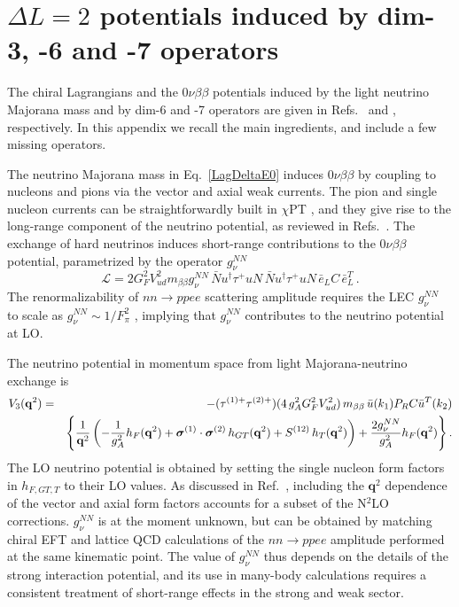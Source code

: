 \documentclass[letterpaper,11pt]{article}
\newcommand{\Dt}{\Delta}
\newcommand{\boldsigma}{\mbox{\boldmath $\sigma$}}
\renewcommand{\vec}[1]{{\mathbf #1}}
\newcommand{\sq}{^{2}}
\newcommand{\nn}{\nonumber}
\begin{document}
\section{$\Dt L=2$ potentials induced by dim-3, -6 and -7 operators} 
\label{app:neutrinopotentials567}


The chiral Lagrangians and the $0\nu\beta\beta$ potentials induced by the light neutrino Majorana mass
and by dim-6 and -7 operators are given in Refs.\ \cite{Cirigliano:2017tvr,Cirigliano:2018hja}
and \cite{Cirigliano:2017djv}, respectively.  In this appendix we recall the main ingredients, and 
include a few missing operators.


The neutrino Majorana mass in Eq.\ \eqref{LagDeltaE0} induces $0\nu\beta\beta$ by coupling to  nucleons and pions via the vector and axial weak currents.
The pion and single nucleon currents can be straightforwardly built in $\chi$PT \cite{Gasser:1983yg,Bernard:1995dp}, 
and they give rise to the long-range component of the neutrino potential, as reviewed in Refs.\ \cite{Cirigliano:2017tvr,Cirigliano:2017djv}.
The exchange of hard neutrinos induces short-range contributions to the $0\nu\beta\beta$ potential, parametrized  by the operator  $g_{\nu}^{NN}$
\begin{equation}\label{gnuNN}
\mathcal L =  2 G_F^2 V_{ud}^2 m_{\beta\beta} g_{\nu}^{NN} \, \bar N u^{\dagger} \tau^+ u N \, \bar N u^{\dagger} \tau^+ u N\, \bar e_L C \, \bar e_L^T\,.
\end{equation}
The renormalizability of $n n \rightarrow p p e e$ scattering amplitude requires the LEC $g^{NN}_{\nu}$
to scale as $g_{\nu}^{NN} \sim 1/F_\pi^2$ \cite{Cirigliano:2018hja}, implying that $g_{\nu}^{NN}$ contributes to the neutrino potential at LO.
 
The  neutrino potential in momentum space from light Majorana-neutrino exchange is 
\begin{eqnarray}\label{nupot}
V_{3}(\vec q\sq) &=& - (\tau^{(1) +} \tau^{(2) +})  (4 \,g_A\sq G_F^2V_{ud}\sq)  \, m_{\beta\beta}  \,  \bar u(k_1) P_RC \bar u^T(k_2)  \\ & & \Bigg\{ \frac{1}{\vec q^2} \left(  - \frac{1}{g_A\sq}h_F(\vec q^2)  + \boldsigma^{(1)}\cdot \boldsigma^{(2)}  \, h_{GT}(\vec q^2)   
+  S^{(12)}\,  h_T(\vec q^2) \right)  
 + \frac{2 g_\nu^{NN}}{g_A^2} h_F(\vec q^2)
\Bigg\}\,.\nn
\end{eqnarray}
The LO neutrino potential is obtained by setting the single nucleon form factors in $h_{F,GT,T}$
to their LO values. As discussed in Ref.\ \cite{Cirigliano:2017djv,Cirigliano:2017tvr}, including the $\vec q^2$ dependence of the vector and axial form factors 
accounts for a subset of the N$^{2}$LO corrections.
$g_{\nu}^{NN}$ is at the moment unknown, but can be obtained by matching chiral EFT and lattice QCD calculations of the
$n n \rightarrow p p e e$ amplitude   performed at the same kinematic point. The value of $g_{\nu}^{NN}$ thus 
depends on the details of the strong interaction potential, and its use in many-body calculations requires a consistent treatment of short-range effects 
in the strong and weak sector. 
\end{document}
